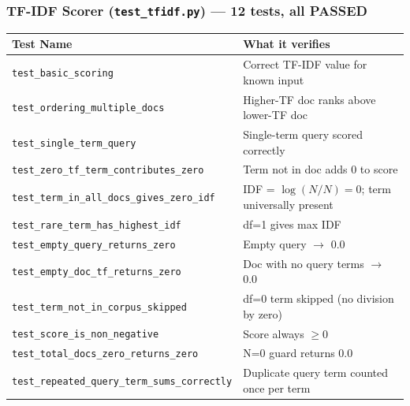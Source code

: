 \documentclass[12pt]{article}
\begin{document}
\subsubsection*{TF-IDF Scorer (\texttt{test\_tfidf.py}) --- 12 tests, all PASSED}
\begin{table}[H]
\centering
\footnotesize
\begin{tabular}{|p{7cm}|p{7.5cm}|}
\hline
\textbf{Test Name} & \textbf{What it verifies} \\
\hline
\texttt{test\_basic\_scoring}                     & Correct TF-IDF value for known input \\
\texttt{test\_ordering\_multiple\_docs}           & Higher-TF doc ranks above lower-TF doc \\
\texttt{test\_single\_term\_query}                & Single-term query scored correctly \\
\texttt{test\_zero\_tf\_term\_contributes\_zero}  & Term not in doc adds 0 to score \\
\texttt{test\_term\_in\_all\_docs\_gives\_zero\_idf} & IDF = $\log(N/N)=0$; term universally present \\
\texttt{test\_rare\_term\_has\_highest\_idf}      & df=1 gives max IDF \\
\texttt{test\_empty\_query\_returns\_zero}        & Empty query $\to$ 0.0 \\
\texttt{test\_empty\_doc\_tf\_returns\_zero}      & Doc with no query terms $\to$ 0.0 \\
\texttt{test\_term\_not\_in\_corpus\_skipped}     & df=0 term skipped (no division by zero) \\
\texttt{test\_score\_is\_non\_negative}           & Score always $\geq 0$ \\
\texttt{test\_total\_docs\_zero\_returns\_zero}   & N=0 guard returns 0.0 \\
\texttt{test\_repeated\_query\_term\_sums\_correctly} & Duplicate query term counted once per term \\
\hline
\end{tabular}
\end{table}
\end{document}
